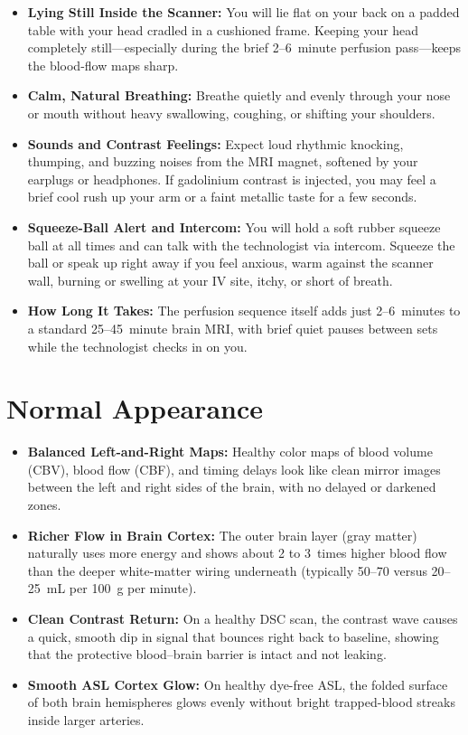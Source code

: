 \begin{itemize}
    \item \textbf{Lying Still Inside the Scanner:} You will lie flat on your back on a padded table with your head cradled in a cushioned frame. Keeping your head completely still---especially during the brief 2--6~minute perfusion pass---keeps the blood-flow maps sharp.
    \item \textbf{Calm, Natural Breathing:} Breathe quietly and evenly through your nose or mouth without heavy swallowing, coughing, or shifting your shoulders.
    \item \textbf{Sounds and Contrast Feelings:} Expect loud rhythmic knocking, thumping, and buzzing noises from the MRI magnet, softened by your earplugs or headphones. If gadolinium contrast is injected, you may feel a brief cool rush up your arm or a faint metallic taste for a few seconds.
    \item \textbf{Squeeze-Ball Alert and Intercom:} You will hold a soft rubber squeeze ball at all times and can talk with the technologist via intercom. Squeeze the ball or speak up right away if you feel anxious, warm against the scanner wall, burning or swelling at your IV site, itchy, or short of breath.
    \item \textbf{How Long It Takes:} The perfusion sequence itself adds just 2--6~minutes to a standard 25--45~minute brain MRI, with brief quiet pauses between sets while the technologist checks in on you.
\end{itemize}

\section{Normal Appearance}

\begin{itemize}
    \item \textbf{Balanced Left-and-Right Maps:} Healthy color maps of blood volume (CBV), blood flow (CBF), and timing delays look like clean mirror images between the left and right sides of the brain, with no delayed or darkened zones.
    \item \textbf{Richer Flow in Brain Cortex:} The outer brain layer (gray matter) naturally uses more energy and shows about 2 to 3~times higher blood flow than the deeper white-matter wiring underneath (typically 50--70 versus 20--25~mL per 100~g per minute).
    \item \textbf{Clean Contrast Return:} On a healthy DSC scan, the contrast wave causes a quick, smooth dip in signal that bounces right back to baseline, showing that the protective blood--brain barrier is intact and not leaking.
    \item \textbf{Smooth ASL Cortex Glow:} On healthy dye-free ASL, the folded surface of both brain hemispheres glows evenly without bright trapped-blood streaks inside larger arteries.
\end{itemize}

